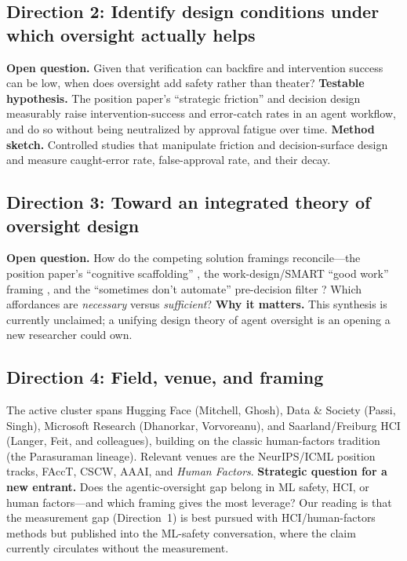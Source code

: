 \documentclass[11pt]{article}
\begin{document}
\subsection{Direction 2: Identify design conditions under which oversight actually helps}

\textbf{Open question.} Given that verification can backfire \citep{recchia2025} and
intervention success can be low, when does oversight add safety rather than theater?
\textbf{Testable hypothesis.} The position paper's ``strategic friction'' and decision
design measurably raise intervention-success and error-catch rates in an agent workflow,
and do so without being neutralized by approval fatigue over time. \textbf{Method sketch.}
Controlled studies that manipulate friction and decision-surface design and measure
caught-error rate, false-approval rate, and their decay.

\subsection{Direction 3: Toward an integrated theory of oversight design}

\textbf{Open question.} How do the competing solution framings reconcile---the position
paper's ``cognitive scaffolding'' \citep{mitchell2026agents}, the work-design/SMART ``good
work'' framing \citep{faas2025}, and the ``sometimes don't automate'' pre-decision filter
\citep{delachica2026}? Which affordances are \emph{necessary} versus \emph{sufficient}?
\textbf{Why it matters.} This synthesis is currently unclaimed; a unifying design theory of
agent oversight is an opening a new researcher could own.

\subsection{Direction 4: Field, venue, and framing}

The active cluster spans Hugging Face (Mitchell, Ghosh), Data \& Society (Passi, Singh),
Microsoft Research (Dhanorkar, Vorvoreanu), and Saarland/Freiburg HCI (Langer, Feit, and
colleagues), building on the classic human-factors tradition (the Parasuraman lineage).
Relevant venues are the NeurIPS/ICML position tracks, FAccT, CSCW, AAAI, and \emph{Human
Factors}. \textbf{Strategic question for a new entrant.} Does the agentic-oversight gap
belong in ML safety, HCI, or human factors---and which framing gives the most leverage? Our
reading is that the measurement gap (Direction~1) is best pursued with HCI/human-factors
methods but published into the ML-safety conversation, where the claim currently circulates
without the measurement.
\end{document}

